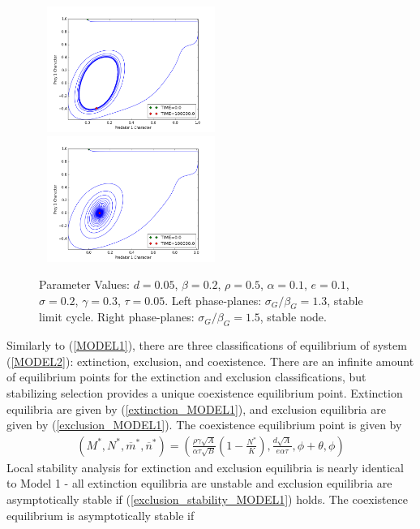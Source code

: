 \documentclass{amsart}
\theoremstyle{definition}
\theoremstyle{remark}
\numberwithin{equation}{section}
\begin{document}
\begin{centering}
\begin{figure}
		\includegraphics[width=6cm,height=4.1cm]{figures/1x1/variable_growth/contour_plots/trait_phase_plane_limit_cycle.png}
		\includegraphics[width=6cm,height=4.1cm]{figures/1x1/variable_growth/contour_plots/trait_phase_plane_node.png}
		\caption{\footnotesize Parameter Values: $d = 0.05$, $\beta = 0.2$, $\rho = 0.5$, $\alpha = 0.1$, $e = 0.1$, $\sigma = 0.2$, $\gamma = 0.3$, $\tau = 0.05$.  Left phase-planes: $\sigma_G/\beta_G = 1.3$, stable limit cycle.  Right phase-planes: $\sigma_G/\beta_G = 1.5$, stable node.}
		\label{fig:hopf_bifurcation}
	\end{figure}
\end{centering}
Similarly to (\ref{MODEL1}), there are three classifications of equilibrium of system (\ref{MODEL2}): extinction, exclusion, and coexistence.  There are an infinite amount of equilibrium points for the extinction and exclusion classifications, but stabilizing selection provides a unique coexistence equilibrium point.  Extinction equilibria are given by (\ref{extinction_MODEL1}), and exclusion equilibria are given by (\ref{exclusion_MODEL1}).  The coexistence equilibrium point is given by
\begin{equation}
	\label{coexistence_MODEL2}
	\begin{aligned}
		(M^*, N^*, \overline{m}^*, \overline{n}^*) = \left(\frac{\rho\gamma\sqrt{A}}{\alpha\tau\sqrt{B}}\left(1 - \frac{N^*}{K}\right), \frac{d\sqrt{A}}{e\alpha\tau}, \phi + \theta, \phi\right)
	\end{aligned}
\end{equation}
Local stability analysis for extinction and exclusion equilibria is nearly identical to Model 1 - all extinction equilibria are unstable and exclusion equilibria are asymptotically stable if (\ref{exclusion_stability_MODEL1}) holds.  The coexistence equilibrium is asymptotically stable if
\end{document}
